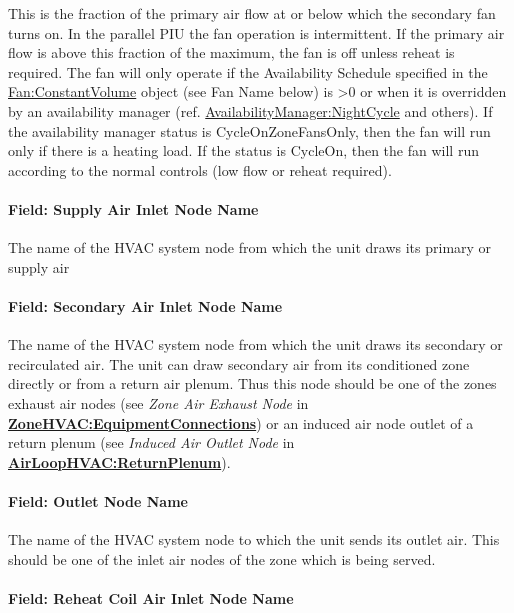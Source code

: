 This is the fraction of the primary air flow at or below which the secondary fan turns on. In the parallel PIU the fan operation is intermittent. If the primary air flow is above this fraction of the maximum, the fan is off unless reheat is required. The fan will only operate if the Availability Schedule specified in the \hyperref[fanconstantvolume]{Fan:ConstantVolume} object (see Fan Name below) is >0 or when it is overridden by an availability manager (ref. \hyperref[availabilitymanagernightcycle]{AvailabilityManager:NightCycle} and others). If the availability manager status is CycleOnZoneFansOnly, then the fan will run only if there is a heating load.  If the status is CycleOn, then the fan will run according to the normal controls (low flow or reheat required).

\paragraph{Field: Supply Air Inlet Node Name}\label{field-supply-air-inlet-node-name-1}

The name of the HVAC system node from which the unit draws its primary or supply air

\paragraph{Field: Secondary Air Inlet Node Name}\label{field-secondary-air-inlet-node-name-1}

The name of the HVAC system node from which the unit draws its secondary or recirculated air. The unit can draw secondary air from its conditioned zone directly or from a return air plenum. Thus this node should be one of the zones exhaust air nodes (see \emph{Zone Air Exhaust Node} in \textbf{\hyperref[zonehvacequipmentconnections]{ZoneHVAC:EquipmentConnections}}) or an induced air node outlet of a return plenum (see \emph{Induced Air Outlet Node} in \textbf{\hyperref[airloophvacreturnplenum]{AirLoopHVAC:ReturnPlenum}}).

\paragraph{Field: Outlet Node Name}\label{field-outlet-node-name-1}

The name of the HVAC system node to which the unit sends its outlet air. This should be one of the inlet air nodes of the zone which is being served.

\paragraph{Field: Reheat Coil Air Inlet Node Name}\label{field-reheat-coil-air-inlet-node-name-1}

